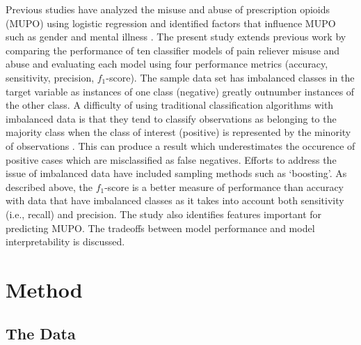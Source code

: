 \documentclass[sigconf]{acmart}
\begin{document}
Previous studies have analyzed the misuse and abuse of prescription opioids
(MUPO) using logistic regression and identified factors that influence MUPO 
such as gender and mental illness \cite{rice12, unick13, jones15, mccabe12}. 
The present study extends previous work by comparing the performance of ten 
classifier models of pain reliever misuse and abuse and evaluating each model 
using four performance metrics (accuracy, sensitivity, precision, $f_1$-score). 
The sample data set has imbalanced classes in the target variable as instances 
of one class (negative) greatly outnumber instances of the other class. 
A difficulty of using traditional classification algorithms with imbalanced 
data is that they tend to classify observations as belonging to the majority 
class when the class of interest (positive) is represented by the minority of 
observations \cite{brown12, yun09}. This can produce a result which 
underestimates the occurence of positive cases which are misclassified as 
false negatives. Efforts to address the issue of imbalanced data have included 
sampling methods such as `boosting'. As described above, the $f_1$-score is 
a better measure of performance than accuracy with data that have imbalanced 
classes as it takes into account both sensitivity (i.e., recall) and precision. 
The study also identifies features important for predicting MUPO. The tradeoffs 
between model performance and model interpretability is discussed. 


\section{Method}

\subsection{The Data}
\end{document}
